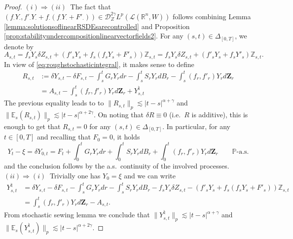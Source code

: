 \documentclass[11pt,a4paper]{article}
\newcommand{\R}{\mathbb{R}}
\newcommand{\E}{\mathbb{E}}
\theoremstyle{plain}
\begin{document}
\begin{proof} $(i)\Rightarrow(ii) \ $ The fact that $(f_{\cdot}Y_{\cdot},f'_{\cdot}Y_{\cdot}+f_{\cdot}(f_\cdot Y_{\cdot}+F'_\cdot))\in \mathscr{D}^{2\gamma}_ZL^p(\mathscr{L}(\R^n,W))$ follows combining Lemma \ref{lemma:solutionsoflinearRSDEsarecontrolled} and Proposition \ref{prop:stabilityundercompositionlinearvectorfields2}.  For any $(s,t) \in \Delta_{[0,T]}$, we denote by \begin{equation*}
    A_{s,t}=f_sY_s\delta Z_{s,t} +(f'_sY_s+f_s(f_sY_s+F'_s))\mathbb{Z}_{s,t} = f_sY_s\delta Z_{s,t} +(f'_sY_s+f_sY'_s)\mathbb{Z}_{s,t}.
\end{equation*} 
In view of \eqref{eq:roughstochasticintegral}, it makes sense to define \begin{equation*} \begin{aligned}
    R_{s,t} &:=\delta Y_{s,t}-\delta F_{s,t}-\int_s^tG_rY_rdr-\int_s^tS_rY_rdB_r - \int_s^t (f_r,f'_r)Y_r d\mathbf{Z}_r \\
    &= A_{s,t}-\int_s^t (f_r,f'_r)Y_r d\mathbf{Z}_r + Y_{s,t}^\natural 
\end{aligned}
\end{equation*} 
The previous equality leads to 
to $\|R_{s,t}\|_p\lesssim|t-s|^{\alpha+\gamma}$ and $\|\E_s(R_{s,t})\|_p\lesssim|t-s|^{\alpha+2\gamma}$. On noting that $\delta R \equiv 0$ (i.e.\ $R$ is additive), this is enough to get that $R_{s,t}=0$ for any $(s,t)\in\Delta_{[0,T]}$. In particular, for any $t \in [0,T]$ and recalling that $F_0=0$, it holds \begin{equation*}
    Y_t-\xi=\delta Y_{0,t}= F_t + \int_0^tG_rY_rdr+\int_0^tS_rY_rdB_r + \int_0^t (f_r,f'_r)Y_r d\mathbf{Z}_r \qquad \text{$\mathbb{P}$-a.s.}
\end{equation*} and the conclusion follows by the a.s.\ continuity of the involved processes.  \\


\noindent $(ii)\Rightarrow(i) \ $ Trivially one has $Y_0=\xi$ and we can write
\begin{equation*}
    \begin{aligned}
        Y_{s,t}^\natural &= \delta Y_{s,t} - \delta F_{s,t} - \int_s^tG_rY_rdr -\int_s^t S_rY_rdB_r - f_sY_s\delta Z_{s,t} -(f'_sY_s+f_s(f_sY_s+F'_s))\mathbb{Z}_{s,t}   \\  &=  \int_s^t (f_r,f'_r)Y_r d\mathbf{Z}_r - A_{s,t}.
    \end{aligned}
\end{equation*}
From stochastic sewing lemma \cite[Theorem 2.9]{FHL21} we conclude that $\|Y_{s,t}^\natural\|_p\lesssim|t-s|^{\alpha+\gamma}$ and $\|\E_s(Y_{s,t}^\natural)\|_p\lesssim|t-s|^{\alpha+2\gamma}$.
\end{proof}
\end{document}
